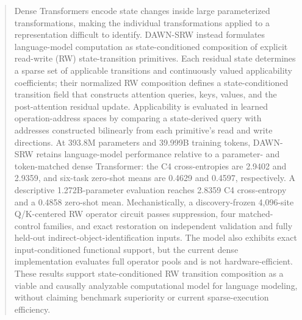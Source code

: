 \documentclass{article}
\begin{document}

\printAffiliationsAndNotice{}

\begin{abstract}
Dense Transformers encode state changes inside large parameterized transformations, making the individual transformations applied to a representation difficult to identify. DAWN-SRW instead formulates language-model computation as state-conditioned composition of explicit read-write (RW) state-transition primitives. Each residual state determines a sparse set of applicable transitions and continuously valued applicability coefficients; their normalized RW composition defines a state-conditioned transition field that constructs attention queries, keys, values, and the post-attention residual update. Applicability is evaluated in learned operation-address spaces by comparing a state-derived query with addresses constructed bilinearly from each primitive's read and write directions. At 393.8M parameters and 39.999B training tokens, DAWN-SRW retains language-model performance relative to a parameter- and token-matched dense Transformer: the C4 cross-entropies are 2.9402 and 2.9359, and six-task zero-shot means are 0.4629 and 0.4597, respectively. A descriptive 1.272B-parameter evaluation reaches 2.8359 C4 cross-entropy and a 0.4858 zero-shot mean. Mechanistically, a discovery-frozen 4,096-site Q/K-centered RW operator circuit passes suppression, four matched-control families, and exact restoration on independent validation and fully held-out indirect-object-identification inputs. The model also exhibits exact input-conditioned functional support, but the current dense implementation evaluates full operator pools and is not hardware-efficient. These results support state-conditioned RW transition composition as a viable and causally analyzable computational model for language modeling, without claiming benchmark superiority or current sparse-execution efficiency.
\end{abstract}
\end{document}
